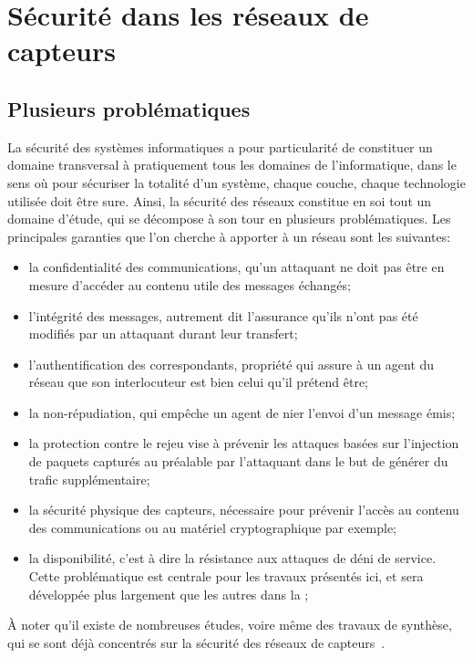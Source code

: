 \section{Sécurité dans les réseaux de capteurs}

\subsection{Plusieurs problématiques}

La sécurité des systèmes informatiques a pour particularité de constituer un domaine transversal à pratiquement tous les domaines de l'informatique, dans le sens où pour sécuriser la totalité d'un système, chaque couche, chaque technologie utilisée doit être sure.
Ainsi, la sécurité des réseaux constitue en soi tout un domaine d'étude, qui se décompose à son tour en plusieurs problématiques.
Les principales garanties que l'on cherche à apporter à un réseau sont les suivantes:
\begin{itemize}
    \item la confidentialité des communications, \cad qu'un attaquant ne doit pas être en mesure d'accéder au contenu utile des messages échangés;
    \item l'intégrité des messages, autrement dit l'assurance qu'ils n'ont pas été modifiés par un attaquant durant leur transfert;
    \item l'authentification des correspondants, propriété qui assure à un agent du réseau que son interlocuteur est bien celui qu'il prétend être;
    \item la non-répudiation, qui empêche un agent de nier l'envoi d'un message émis;
    \item la protection contre le rejeu vise à prévenir les attaques basées sur l'injection de paquets capturés au préalable par l'attaquant dans le but de générer du trafic supplémentaire;
    \item la sécurité physique des capteurs, nécessaire pour prévenir l'accès au contenu des communications ou au matériel cryptographique par exemple;
    \item la disponibilité, c'est à dire la résistance aux attaques de déni de service. Cette problématique est centrale pour les travaux présentés ici, et sera développée plus largement que les autres dans la ;
\end{itemize}
À noter qu'il existe de nombreuses études, voire même des travaux de synthèse, qui se sont déjà concentrés sur la sécurité des réseaux de capteurs~\cite{DYK12,AD14}.

